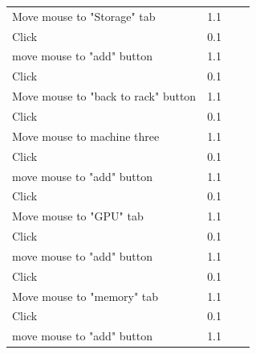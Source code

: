 \documentclass[11pt]{article}
\begin{document}
\begin{table}[h!]
{\begin{tabular}{lrlr}
					Move mouse to "Storage" tab              & 1.1       &                                                 &     \\
					Click                                    & 0.1       &                                                 &     \\
					move mouse to "add" button               & 1.1       &                                                 &     \\
					Click                                    & 0.1       &                                                 &     \\
					Move mouse to "back to rack" button      & 1.1       &                                                 &     \\
					Click                                    & 0.1       &                                                 &     \\
					Move mouse to machine three              & 1.1       &                                                 &     \\
					Click                                    & 0.1       &                                                 &     \\
					move mouse to "add" button               & 1.1       &                                                 &     \\
					Click                                    & 0.1       &                                                 &     \\
					Move mouse to "GPU" tab                  & 1.1       &                                                 &     \\
					Click                                    & 0.1       &                                                 &     \\
					move mouse to "add" button               & 1.1       &                                                 &     \\
					Click                                    & 0.1       &                                                 &     \\
					Move mouse to "memory" tab               & 1.1       &                                                 &     \\
					Click                                    & 0.1       &                                                 &     \\
					move mouse to "add" button               & 1.1       &                                                 &     \\

\end{tabular}}
\end{table}
\end{document}
